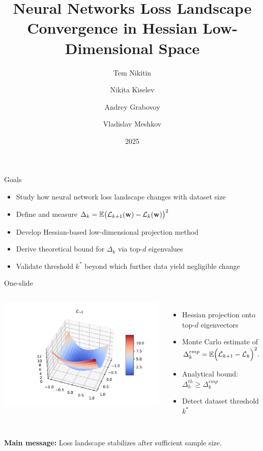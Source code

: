 \documentclass{beamer}
\title[Loss Landscape Convergence]{Neural Networks Loss Landscape Convergence in Hessian Low-Dimensional Space}
\author[Tem Nikitin \textit{et al.}]{Tem Nikitin \and Nikita Kiselev \and Andrey Grabovoy \and Vladislav Meshkov}
\institute{Moscow Institute of Physics and Technology}
\date{2025}
\begin{document}
\begin{frame}
    \thispagestyle{empty}
    \maketitle
\end{frame}

\begin{frame}{Goals}
    \begin{itemize}
        \item Study how neural network loss landscape changes with dataset size
        \item Define and measure $\Delta_k = \mathbb{E} \bigl( \mathcal{L}_{k+1}(\mathbf{w}) - \mathcal{L}_k(\mathbf{w}) \bigr)^2$
        \item Develop Hessian-based low-dimensional projection method
        \item Derive theoretical bound for $\Delta_k$ via top-$d$ eigenvalues
        \item Validate threshold $k^*$ beyond which further data yield negligible change
    \end{itemize}
\end{frame}

\begin{frame}{One-slide}
    \begin{columns}[c]
        \hspace{-1.5cm}
        \includegraphics[width=1.2\textwidth]{img/loss_eigen_-1_individ.pdf}
        \begin{itemize}
            \item Hessian projection onto top-$d$ eigenvectors
            \item Monte Carlo estimate of $\Delta_k^{emp} = \mathbb{E} \Bigl( \mathcal{L}_{k+1} - \mathcal{L}_{k} \Bigr)^2.$
            \item Analytical bound: $\Delta_k^{th} \ge \Delta_k^{emp}$
            \item Detect dataset threshold $k^*$
        \end{itemize}
    \end{columns}
    \bigskip
    \textbf{Main message:} Loss landscape stabilizes after sufficient sample size.
\end{frame}
\end{document}
